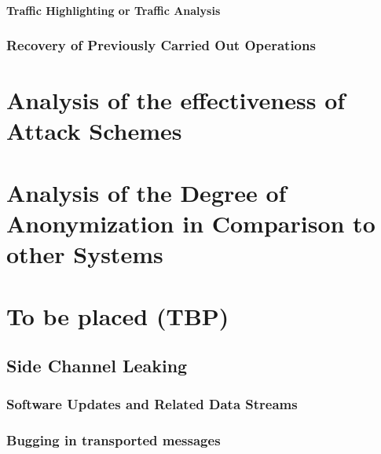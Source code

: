 \subsubsection{Traffic Highlighting or Traffic Analysis}
\subsection{Recovery of Previously Carried Out Operations}

\chapter{Analysis of the effectiveness of Attack Schemes}
\chapter{Analysis of the Degree of Anonymization in Comparison to other Systems}

\chapter{To be placed (TBP)}
\section{Side Channel Leaking}
\subsection{Software Updates and Related Data Streams}
\subsection{Bugging in transported messages}

